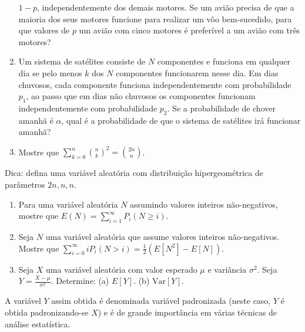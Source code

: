 \documentclass[
  10pt,
]{article}
\begin{document}
\begin{enumerate}
  \(1 - p\), independentemente dos demais motores. Se um avião precisa
  de que a maioria dos seus motores funcione para realizar um vôo
  bem-sucedido, para que valores de \(p\) um avião com cinco motores é
  preferível a um avião com três motores?
\item
  Um sistema de satélites consiste de \(N\) componentes e funciona em
  qualquer dia se pelo menos \(k\) dos \(N\) componentes funcionarem
  nesse dia. Em dias chuvosos, cada componente funciona
  independentemente com probabilidade \(p_1\), ao passo que em dias não
  chuvosos os componentes funcionam independentemente com probabilidade
  \(p_2\). Se a probabilidade de chover amanhã é \(\alpha\), qual é a
  probabilidade de que o sistema de satélites irá funcionar amanhã?
\item
  Mostre que \(\sum_{k=0}^{n} \binom{n}{k}^2 = \binom{2n}{n}\).
\end{enumerate}

Dica: defina uma variável aleatória com distribuição hipergeométrica de
parâmetros \(2n, n, n\).

\begin{enumerate}
\def\labelenumi{\arabic{enumi}.}
\setcounter{enumi}{15}
\item
  Para uma variável aleatória \(N\) assumindo valores inteiros
  não-negativos, mostre que
  \(E(N) = \sum_{i=1}^{\infty} P_i(N \geq i)\).
\item
  Seja \(N\) uma variável aleatória que assume valores inteiros
  não-negativos. Mostre que
  \(\sum_{i=0}^{\infty} iP_i(N > i) = \frac{1}{2}(E[N^2] - E[N])\).
\item
  Seja \(X\) uma variável aleatória com valor esperado \(\mu\) e
  variância \(\sigma^2\). Seja \(Y = \frac{X - \mu}{\sigma^2}\).
  Determine: (a) \(E[Y]\). (b) \(\text{Var}[Y]\).
\end{enumerate}

A variável \(Y\) assim obtida é denominada variável padronizada (neste
caso, \(Y\) é obtida padronizando-se \(X\)) e é de grande importância em
várias técnicas de análise estatística.
\end{document}
